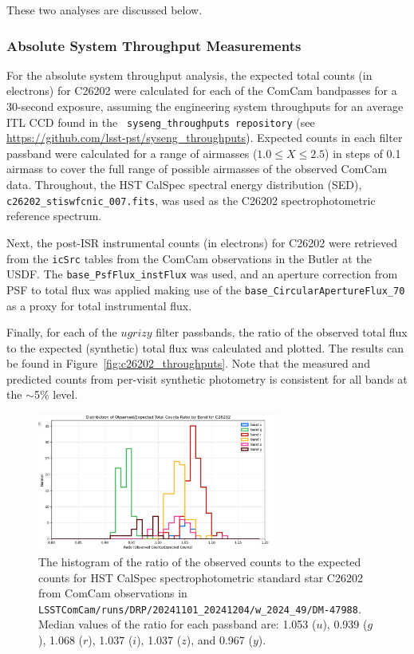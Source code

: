 These two analyses are discussed below.

\subsubsection{Absolute System Throughput Measurements}

For the absolute system throughput analysis, the expected total counts
(in electrons) for C26202 were calculated for each of the ComCam
bandpasses for a 30-second exposure, assuming the engineering system
throughputs for an average ITL CCD found in the {\tt
  syseng\_throughputs repository} (see
\url{https://github.com/lsst-pst/syseng\_throughputs}). Expected
counts in each filter passband were calculated for a range of
airmasses ($1.0 \leq X \leq 2.5$) in steps of 0.1 airmass to cover the
full range of possible airmasses of the observed ComCam data.
Throughout, the HST CalSpec spectral energy distribution (SED), {\tt
  c26202\_stiswfcnic\_007.fits}, was used as the C26202
spectrophotometric reference spectrum.

Next, the post-ISR instrumental counts (in electrons) for C26202 were
retrieved from the {\tt icSrc} tables from the ComCam observations in
the Butler at the USDF.  The {\tt base\_PsfFlux\_instFlux} was used,
and an aperture correction from PSF to total flux was applied making
use of the {\tt base\_CircularApertureFlux\_70} as a proxy for total
instrumental flux.

Finally, for each of the $ugrizy$ filter passbands, the ratio of the
observed total flux to the expected (synthetic) total flux was
calculated and plotted.  The results can be found in
Figure~\ref{fig:c26202_throughputs}.  Note that the measured and
predicted counts from per-visit synthetic photometry is consistent for
all bands at the $\sim$5\% level.

\begin{figure}
  \begin{center}
    \includegraphics[width=0.7\textwidth]{photometric_calibration_figures/LSSTComCam_Absolute_Throughputs_20241210.png}
  \end{center}
  \caption{\label{fig:c26202_throughputs}The histogram of the ratio of
    the observed counts to the expected counts for HST CalSpec
    spectrophotometric standard star C26202 from ComCam observations
    in {\tt
      LSSTComCam/runs/DRP/20241101\_20241204/w\_2024\_49/DM-47988}.
    Median values of the ratio for each passband are: 1.053 ($u$),
    0.939 ($g$), 1.068 ($r$), 1.037 ($i$), 1.037 ($z$), and 0.967
    ($y$).}
  \label{fig:c26202_ab_offsets}
\end{figure}


